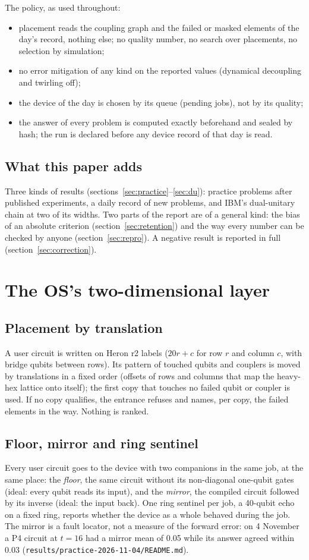 \documentclass[10pt,a4paper]{article}
\begin{document}
The policy, as used throughout:
\begin{itemize}
\item placement reads the coupling graph and the failed or masked elements of the day's record, nothing else; no
quality number, no search over placements, no selection by simulation;
\item no error mitigation of any kind on the reported values (dynamical decoupling and twirling off);
\item the device of the day is chosen by its queue (pending jobs), not by its quality;
\item the answer of every problem is computed exactly beforehand and sealed by hash; the run is declared before any
device record of that day is read.
\end{itemize}

\subsection{What this paper adds}
Three kinds of results (sections~\ref{sec:practice}--\ref{sec:du}): practice problems after published experiments,
a daily record of new problems, and IBM's dual-unitary chain at two of its widths. Two parts of the report are of a
general kind: the bias of an absolute criterion (section~\ref{sec:retention}) and the way every number can be checked
by anyone (section~\ref{sec:repro}). A negative result is reported in full (section~\ref{sec:correction}).

\section{The OS's two-dimensional layer}

\subsection{Placement by translation}
A user circuit is written on Heron r2 labels ($20r + c$ for row $r$ and column $c$, with bridge qubits between
rows). Its pattern of touched qubits and couplers is moved by translations in a fixed order (offsets of rows and
columns that map the heavy-hex lattice onto itself); the first copy that touches no failed qubit or coupler is used.
If no copy qualifies, the entrance refuses and names, per copy, the failed elements in the way. Nothing is ranked.

\subsection{Floor, mirror and ring sentinel}
Every user circuit goes to the device with two companions in the same job, at the same place: the \emph{floor}, the
same circuit without its non-diagonal one-qubit gates (ideal: every qubit reads its input), and the \emph{mirror},
the compiled circuit followed by its inverse (ideal: the input back). One ring sentinel per job, a 40-qubit echo on
a fixed ring, reports whether the device as a whole behaved during the job. The mirror is a fault locator, not a
measure of the forward error: on 4 November a P4 circuit at $t = 16$ had a mirror mean of 0.05 while its answer agreed
within 0.03 (\texttt{results/practice-2026-11-04/README.md}).
\end{document}
